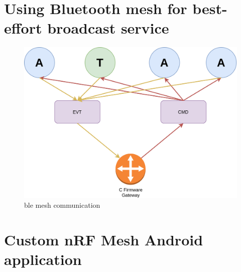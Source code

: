 \documentclass[\main/main.tex]{subfiles}
\begin{document}
\section{Using Bluetooth mesh for best-effort broadcast service}

\begin{figure}[H]
    \begin{center}
        \includegraphics[scale=0.4]{ble_mesh_comunication.png}
    \end{center}
    \caption{ble mesh communication}
    \label{fig:ble_mesh_comunication}
\end{figure}

\section{Custom nRF Mesh Android application}
\bib
\end{document}
